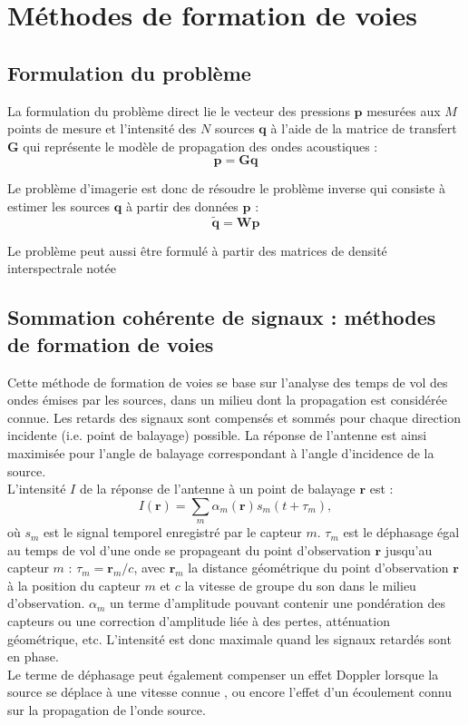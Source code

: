\section{Méthodes de formation de voies}

\subsection{Formulation du problème}

La formulation du problème direct lie le vecteur des pressions $\bm{p}$ mesurées aux $M$ points de mesure et l'intensité des $N$ sources $\bm{q}$ à l'aide de la matrice de transfert $\bm{G}$ qui représente le modèle de propagation des ondes acoustiques : 
\begin{equation}
\bm{p}=\bm{G}\bm{q}
\end{equation}

Le problème d'imagerie est donc de résoudre le problème inverse qui consiste à estimer les sources $\bm{q}$ à partir des données  $\bm{p}$ :
\begin{equation}
\bm{\tilde{q}}=\bm{W}\bm{p}
\end{equation}

Le problème peut aussi être formulé à partir des matrices de densité interspectrale notée 


\subsection{Sommation cohérente de signaux : méthodes de formation de voies}
Cette méthode de formation de voies se base sur l'analyse des temps de vol des ondes émises par les sources, dans un milieu dont la propagation est considérée connue. Les retards des signaux sont compensés et sommés pour chaque direction incidente (i.e. point de balayage) possible. La réponse de l'antenne est ainsi maximisée pour l'angle de balayage correspondant à l'angle d'incidence de la source.\\
L'intensité $I$ de la réponse de l'antenne à un point de balayage $\bm{r}$ est : 
\begin{equation}
I(\bm{r})=\sum_{m} \alpha_m(\bm{r}) s_m(t+\tau_m),
\end{equation}
où $s_m$ est le signal temporel enregistré par le capteur $m$. $\tau_m$ est le déphasage égal au temps de vol d'une onde se propageant du point d'observation $\bm{r}$ jusqu'au capteur $m$ : $\tau_m=\bm{r}_m / c$, avec $\bm{r}_m$ la distance géométrique du point d'observation $\bm{r}$ à la position du capteur $m$ et $c$ la vitesse de groupe du son dans le milieu d'observation. $\alpha_m$ un terme d'amplitude pouvant contenir une pondération des capteurs ou une correction d'amplitude liée à des pertes, atténuation géométrique, etc. L'intensité est donc maximale quand les signaux retardés sont en phase.\\
Le terme de déphasage peut également compenser un effet Doppler lorsque la source se déplace à une vitesse connue \citep{howell_1986}, ou encore l'effet d'un écoulement connu sur la propagation de l'onde source.\\

